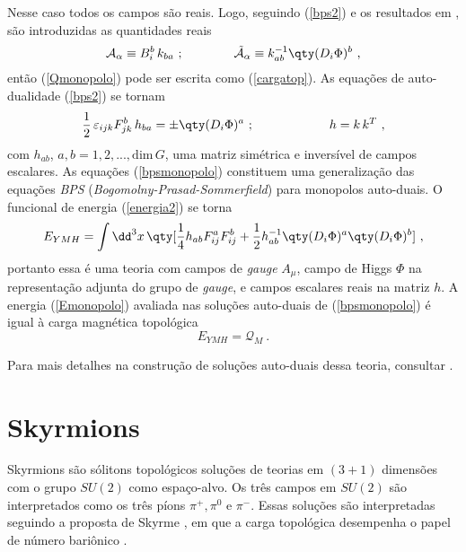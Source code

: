 Nesse caso todos os campos são reais. Logo, seguindo (\ref{bps2}) e os resultados em \cite{LafHenBPS}, são introduzidas as quantidades reais
\begin{equation}
    \mathcal{A}_\alpha \equiv B_i^b \, k_{ba} \ ; \qquad \qquad \tilde{\mathcal{A}}_\alpha \equiv k^{-1}_{ab} \qty(D_i\Phi)^b \ ,
\end{equation}
então (\ref{Qmonopolo}) pode ser escrita como (\ref{cargatop}). As equações de auto-dualidade (\ref{bps2}) se tornam
\begin{equation}
    \dfrac{1}{2} \, \varepsilon_{ijk}F_{jk}^b\, h_{ba} = \pm \qty(D_i \Phi)^a \ ; \qquad\qquad\qquad h = k\,k^T \ ,
    \label{bpsmonopolo}
\end{equation}
com $h_{ab}$, $a,b = 1,2,...,\text{dim} \, G$, uma matriz simétrica e inversível de campos escalares. As equações (\ref{bpsmonopolo}) constituem uma generalização das equações \textit{BPS} (\textit{Bogomolny-Prasad-Sommerfield}) \cite{bps_1976, monopolohooft} para monopolos auto-duais. O funcional de energia (\ref{energia2}) se torna \cite{LafHenBPS}
\begin{equation}
    E_{YMH} = \int \dd^3x \, \qty[\dfrac{1}{4}h_{ab}F^{a}_{ij}F^b_{ij} + \dfrac{1}{2}h^{-1}_{ab} \qty(D_i\Phi)^a \qty(D_i\Phi)^b] \ ,
    \label{Emonopolo}
\end{equation}
portanto essa é uma teoria com campos de \textit{gauge} $A_\mu$, campo de Higgs $\Phi$ na representação adjunta do grupo de \textit{gauge}, e campos escalares reais na matriz $h$. A energia (\ref{Emonopolo}) avaliada nas soluções auto-duais de (\ref{bpsmonopolo}) é igual à carga magnética topológica
\begin{equation}
    E_{YMH} = \mathcal{Q}_M \ .
\end{equation}

Para mais detalhes na construção de soluções auto-duais dessa teoria, consultar \cite{LafHenBPS}.

\section{Skyrmions}

Skyrmions são sólitons topológicos soluções de teorias em $(3+1)$ dimensões com o grupo $SU(2)$ como espaço-alvo. Os três campos em $SU(2)$ são interpretados como os três píons $\pi^+, \pi^0$ e $\pi^-$. Essas soluções são interpretadas seguindo a proposta de Skyrme \cite{skyrmeNonLinear, skyrmeMesons}, em que a carga topológica desempenha o papel de número bariônico \cite{TopSol, shnirTop}.

